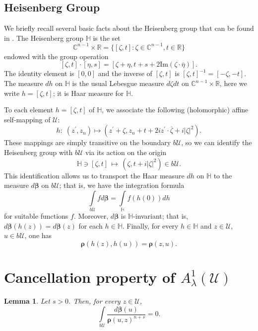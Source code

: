 \documentclass{amsart}
\newtheorem{lemma}[theorem]{Lemma}
\numberwithin{equation}{section}
\newcommand{\calU}{\mathcal{U}}
\newcommand{\bfbeta}{\boldsymbol{\beta}}
\newcommand{\bfrho}{\boldsymbol{\rho}}
\newcommand{\bbC}{\mathbb{C}}
\newcommand{\bbR}{\mathbb{R}}
\newcommand{\bbH}{\mathbb{H}}
\newcommand{\bSieg}{b\mathcal{U}}
\begin{document}
\subsection{Heisenberg Group}
We briefly recall several basic facts about the Heisenberg group that can be found in \cite[Chapter XII]{Ste93}.
The Heisenberg group $\bbH$ is the set
\[
\bbC^{n-1} \times \bbR = \{ [\zeta,t]: \zeta\in \bbC^{n-1}, t\in \bbR\}
\]
endowed with the group operation
\[
[\zeta,t]\cdot [\eta,s]=[\zeta+\eta, t+s+2 \mathrm{Im}(\zeta\cdot \bar{\eta})].
\]
The identity element is $[0,0]$ and the inverse of
$[\zeta,t]$ is $[\zeta,t]^{-1}=[-\zeta,-t]$.
The measure $dh$ on $\bbH$ is the usual Lebesgue measure $d\zeta dt$ on $\bbC^{n-1}\times \bbR$, here we write $h=[\zeta,t]$; it is Haar measure for $\bbH$.


To each element $h=[\zeta,t]$ of $\bbH$, we associate the following (holomorphic) affine self-mapping of
$\calU$:
\begin{equation*}\label{eqn:groupaction}
h:\; (z^{\prime},z_{n}) \longmapsto (z^{\prime}+\zeta, z_{n}+t+ 2i z^{\prime}\cdot \bar{\zeta} + i|\zeta|^2).
\end{equation*}
These mappings are simply transitive on the boundary $b\calU$,
so we can identify the Heisenberg group with $b\calU$ via its action on the origin
\[
\bbH \ni [\zeta,t] \,\longmapsto\, (\zeta, t+i|\zeta|^2) \in b\calU.
\]
This identification allows us to transport the Haar measure $dh$ on $\bbH$ to the measure $d\bfbeta$ on $b\calU$;
that is, we have the integration formula
\begin{equation*}\label{eqn:defnofbeta}
\int\limits_{b\calU} f d\bfbeta = \int\limits_{\bbH}f(h(0)) dh
\end{equation*}
for suitable functions $f$.
Moreover, $d\bfbeta$ is $\bbH$-invariant; that is, $d\bfbeta(h(z))=d\bfbeta(z)$ for each $h\in\bbH$.
Finally, for every $h\in\bbH$ and $z\in\calU$, $u\in b\calU$, one has
\[
\bfrho(h(z),h(u))=\bfrho(z,u).
\]










\section{Cancellation property of $A_{\lambda}^1(\calU)$}

\begin{lemma}\label{lem:bUrho=0}
Let $s>0$. Then, for every $z\in\calU$,
\begin{equation*}\label{eq:int,rho}
\int\limits_{\bSieg} \frac {d\bfbeta(u)} {\bfrho(u,z)^{n+s}} = 0.
\end{equation*}
\end{lemma}
\end{document}
